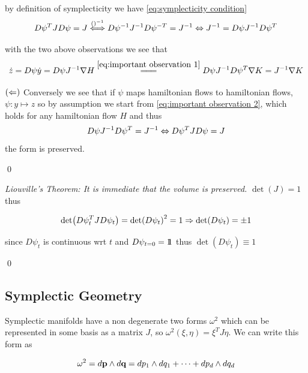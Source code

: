 \documentclass[12pt]{article}
\begin{document}
by definition of symplecticity we have \eqref{eq:symplecticity condition}
\begin{equation}\label{eq:symplecticity condition}
    D\psi^TJD\psi = J \stackrel{()^{-1}}{\Longleftrightarrow} D\psi^{-1}J^{-1}D\psi^{-T} = J^{-1} \Leftrightarrow J^{-1} = D\psi J^{-1} D\psi^T
\end{equation}

with the two above observations we see that 
\begin{equation}\label{eq:important observation 2}
    \dot z = D\psi \dot y = D\psi J^{-1}\nabla H \overset{\eqref{eq:important observation 1}}{\longlongeq} D\psi J^{-1} D\psi^T \nabla K = J^{-1}\nabla K
\end{equation}

$(\Leftarrow)$ Conversely we see that if $\psi$ maps hamiltonian flows to hamiltonian flows, $\psi : y\mapsto z$ so by assumption we start from \eqref{eq:important observation 2}, which holds for any hamiltonian flow $H$ and thus
$$D\psi J^{-1}D\psi^T = J^{-1} \Leftrightarrow D\psi^T JD\psi = J$$
the form is preserved.

\qed

 \textit{Liouville's Theorem: It is immediate that the volume is preserved.} $\det(J) = 1$ thus

$$
\det(D\psi_t^TJD\psi_t) = \det(D\psi_t)^2 = 1 \Rightarrow \det(D\psi_t)=\pm 1
$$

since $D\psi_t$ is continuous wrt $t$ and $D\psi_{t=0}=1\!\!1$ thus $\det (D\psi_t)\equiv 1$

\qed

\subsection{Symplectic Geometry}


Symplectic manifolds have a non degenerate two forms $\omega^2$ which can be represented in some basis as a matrix $J$, so $\omega^2(\xi,\eta) = \xi^TJ\eta$. We can write this form as

$$\omega^2 = d\textbf p \wedge d\textbf q = dp_1\wedge dq_1 + \cdots + d p_d\wedge dq_d$$
\end{document}
